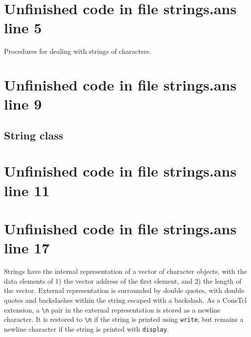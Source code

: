 \documentclass[twoside,9pt]{report}
\begin{document}
\section{Unfinished code in file strings.ans line 5}


Procedures for dealing with strings of characters.

\section{Unfinished code in file strings.ans line 9}
\subsection{String class}
\label{string-class}
\section{Unfinished code in file strings.ans line 11}

\section{Unfinished code in file strings.ans line 17}

Strings have the internal representation of a vector of character objects, with the data elements of 1) the vector address of the first element, and 2) the length of the vector. External representation is surrounded by double quotes, with double quotes and backslashes within the string escaped with a backslash. As a ConsTcl extension, a \texttt{\textbackslash n} pair in the external representation is stored as a newline character. It is restored to \texttt{\textbackslash n} if the string is printed using \texttt{write}, but remains a newline character if the string is printed with \texttt{display}.
\end{document}
